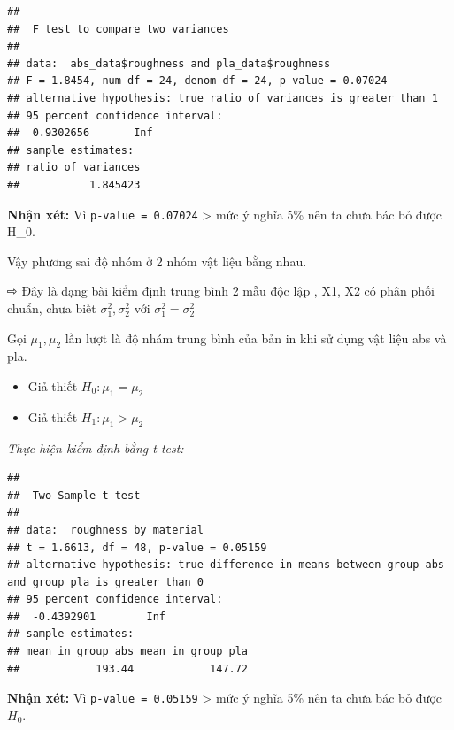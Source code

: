 \begin{verbatim}
## 
##  F test to compare two variances
## 
## data:  abs_data$roughness and pla_data$roughness
## F = 1.8454, num df = 24, denom df = 24, p-value = 0.07024
## alternative hypothesis: true ratio of variances is greater than 1
## 95 percent confidence interval:
##  0.9302656       Inf
## sample estimates:
## ratio of variances 
##           1.845423
\end{verbatim}

\textbf{Nhận xét:} Vì \texttt{p-value\ =\ 0.07024} \textgreater{} mức ý
nghĩa 5\% nên ta chưa bác bỏ được H\_0.

Vậy phương sai độ nhóm ở 2 nhóm vật liệu bằng nhau.

⇨ Đây là dạng bài kiểm định trung bình 2 mẫu độc lập , X1, X2 có phân phối chuẩn, chưa biết \(\sigma_1^2, \sigma_2^2\) với \(\sigma_1^2=  \sigma_2^2\)

Gọi \(\mu_1 , \mu_2 \) lần lượt là độ nhám trung bình của bản in khi sử dụng vật liệu
abs và pla.

\begin{itemize}
\tightlist
\item
  Giả thiết \(H_0: \mu_1 = \mu_2\)\\
\item
  Giả thiết \(H_1: \mu_1 > \mu_2\)
\end{itemize}

\emph{Thực hiện kiểm định bằng t-test: }

\begin{Shaded}
\begin{Highlighting}[]
\SpecialCharTok{\textasciitilde{}} \NormalTok{, } \NormalTok{)}
\end{Highlighting}
\end{Shaded}

\begin{verbatim}
## 
##  Two Sample t-test
## 
## data:  roughness by material
## t = 1.6613, df = 48, p-value = 0.05159
## alternative hypothesis: true difference in means between group abs and group pla is greater than 0
## 95 percent confidence interval:
##  -0.4392901        Inf
## sample estimates:
## mean in group abs mean in group pla 
##            193.44            147.72
\end{verbatim}

\textbf{Nhận xét:} Vì \texttt{p-value\ =\ 0.05159} \textgreater{} mức ý
nghĩa 5\% nên ta chưa bác bỏ được \(H_0\).

